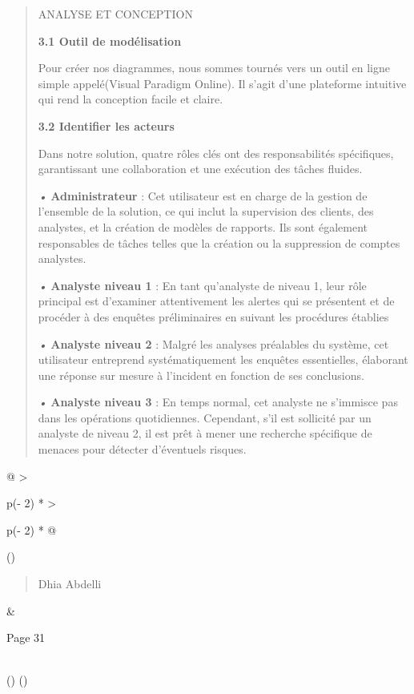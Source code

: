 \documentclass[
]{article}
\begin{document}
\begin{quote}
ANALYSE ET CONCEPTION

\textbf{3.1 Outil de modélisation}

Pour créer nos diagrammes, nous sommes tournés vers un outil en ligne
simple appelé(Visual Paradigm Online). Il s'agit d'une plateforme
intuitive qui rend la conception facile et claire.

\textbf{3.2 Identifier les acteurs}

Dans notre solution, quatre rôles clés ont des responsabilités
spécifiques, garantissant une collaboration et une exécution des tâches
fluides.

\emph{•} \textbf{Administrateur} : Cet utilisateur est en charge de la
gestion de l'ensemble de la solution, ce qui inclut la supervision des
clients, des analystes, et la création de modèles de rapports. Ils sont
également responsables de tâches telles que la création ou la
suppression de comptes analystes.

\emph{•} \textbf{Analyste niveau 1} : En tant qu'analyste de niveau 1,
leur rôle principal est d'examiner attentivement les alertes qui se
présentent et de procéder à des enquêtes préliminaires en suivant les
procédures établies

\emph{•} \textbf{Analyste niveau 2} : Malgré les analyses préalables du
système, cet utilisateur entreprend systématiquement les enquêtes
essentielles, élaborant une réponse sur mesure à l'incident en fonction
de ses conclusions.

\emph{•} \textbf{Analyste niveau 3} : En temps normal, cet analyste ne
s'immisce pas dans les opérations quotidiennes. Cependant, s'il est
sollicité par un analyste de niveau 2, il est prêt à mener une recherche
spécifique de menaces pour détecter d'éventuels risques.
\end{quote}

\begin{longtable}[]{@{}
  >{\raggedright\arraybackslash}p{(\columnwidth - 2\tabcolsep) * }
  >{\raggedright\arraybackslash}p{(\columnwidth - 2\tabcolsep) * }@{}}
\toprule()
\begin{minipage}[b]{\linewidth}\raggedright
\begin{quote}
Dhia Abdelli
\end{quote}
\end{minipage} & \begin{minipage}[b]{\linewidth}\raggedright
Page 31
\end{minipage} \\
\midrule()
\endhead
\bottomrule()
\end{longtable}
\end{document}
